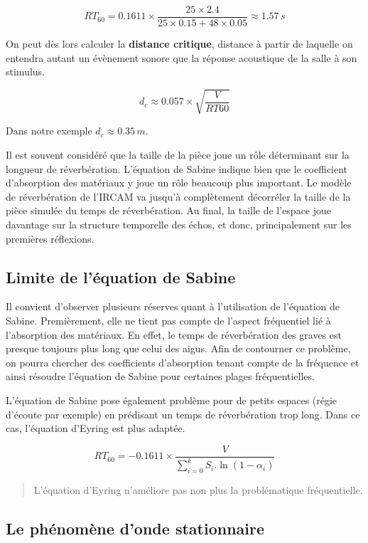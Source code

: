 \documentclass[
]{book}
\begin{document}
\[RT_{60} = 0.1611 \times \frac{25 \times 2.4}{25\times0.15+48\times0.05} \approx 1.57\,s\]

On peut dès lors calculer la \textbf{distance critique}, distance à partir de laquelle on entendra autant un évènement sonore que la réponse acoustique de la salle à son stimulus.

\[d_c \approx 0.057 \times \sqrt{\frac{V}{RT60}}\]

Dans notre exemple \(d_c \approx 0.35\,m\).

Il est souvent considéré que la taille de la pièce joue un rôle déterminant sur la longueur de réverbération. L'équation de Sabine indique bien que le coefficient d'absorption des matériaux y joue un rôle beaucoup plus important. Le modèle de réverbération de l'IRCAM va jusqu'à complètement décorréler la taille de la pièce simulée du temps de réverbération. Au final, la taille de l'espace joue davantage sur la structure temporelle des échos, et donc, principalement sur les premières réflexions.

\hypertarget{limite-de-luxe9quation-de-sabine}{%
\subsection{Limite de l'équation de Sabine}\label{limite-de-luxe9quation-de-sabine}}

Il convient d'observer plusieurs réserves quant à l'utilisation de l'équation de Sabine. Premièrement, elle ne tient pas compte de l'aspect fréquentiel lié à l'absorption des matériaux. En effet, le temps de réverbération des graves est presque toujours plus long que celui des aigus. Afin de contourner ce problème, on pourra chercher des coefficients d'absorption tenant compte de la fréquence et ainsi résoudre l'équation de Sabine pour certaines plages fréquentielles.

L'équation de Sabine pose également problème pour de petits espaces (régie d'écoute par exemple) en prédisant un temps de réverbération trop long. Dans ce cas, l'équation d'Eyring est plus adaptée.

\[RT_{60} = -0.1611 \times \frac{V}{\sum_{i=0}^{k} S_i.\ln(1-\alpha_i)}\]

\begin{quote}
L'équation d'Eyring n'améliore pas non plus la problématique fréquentielle.
\end{quote}

\hypertarget{le-phuxe9nomuxe8ne-donde-stationnaire}{%
\subsection{Le phénomène d'onde stationnaire}\label{le-phuxe9nomuxe8ne-donde-stationnaire}}
\end{document}
